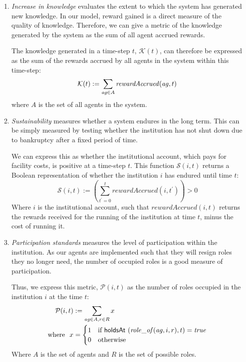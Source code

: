 \begin{enumerate}
\item \emph{Increase in knowledge} evaluates the extent to which the system has
generated new knowledge. In our model, reward gained is a direct measure of the
quality of knowledge. Therefore, we can give a metric of the knowledge generated
by the system as the sum of all agent accrued rewards.

The knowledge generated in a time-step $t$, $\mathcal{K}(t)$, can therefore be expressed as the sum of the rewards accrued by all agents in the system within this time-step:
\begin{equation*}
\mathcal{K}(t) := \sum_{\mathit{ag}\in A} \mathit{rewardAccrued}(\mathit{ag}, t)
\end{equation*}
where $A$ is the set of all agents in the system.

\item \emph{Sustainability} measures whether a system endures in the long term.
This can be simply measured by testing whether the institution has not shut down 
due to bankruptcy after a fixed period of time.

We can express this as whether the institutional account, which pays for facility costs, is positive at a time-step $t$. This function $\mathcal{S}(i,t)$ returns a Boolean representation of whether the institution $i$ has endured until time $t$:
\begin{equation*}
\mathcal{S}(i,t) := \left( \sum_{t^\prime=0}^{t} \mathit{rewardAccrued}(i, t^\prime)\right) > 0
\end{equation*}
Where $i$ is the institutional account, such that $\mathit{rewardAccrued}(i, t)$ returns the rewards received for the running of the institution at time $t$, minus the cost of running it.

\item \emph{Participation standards} measures the level of participation within the 
institution. As our agents are implemented such that they will resign roles they 
no longer need, the number of occupied roles is a good measure of participation.

Thus, we express this metric, $\mathcal{P}(i,t)$ as the number of roles occupied in the institution $i$ at the time $t$:
\begin{align*}
\mathcal{P}(i,t) &:= \sum_{\mathit{ag}\in A,r\in R} x \\
\text{where\ \ } x &= \begin{cases} 1 & \text{if} \,\, \mathsf{holdsAt} \,\,(\mathit{role\_of}(\mathit{ag},i,r),t) = \mathit{true} \\
0 & \text{otherwise} \end{cases}
\end{align*}
Where $A$ is the set of agents and $R$ is the set of possible roles.


\end{enumerate}
